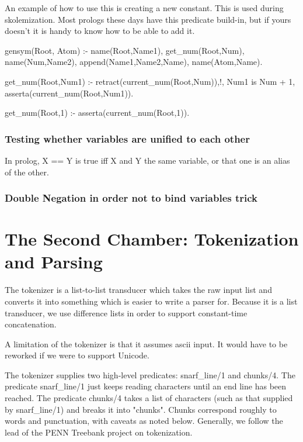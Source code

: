 \documentclass{book}[9pt]
\newenvironment{code}%
{\small \verbatim}%
{\endverbatim \large}
\begin{document}
An example of how to use this is creating a new constant.  This is
used during skolemization.  Most prologs these days have this
predicate build-in, but if yours doesn't it is handy to know how to be
able to add it.

\begin{code}
gensym(Root, Atom) :-
        name(Root,Name1),
        get_num(Root,Num),
        name(Num,Name2),
        append(Name1,Name2,Name),
        name(Atom,Name).

get_num(Root,Num1) :-
        retract(current_num(Root,Num)),!,
        Num1 is Num + 1,
        asserta(current_num(Root,Num1)).

get_num(Root,1) :- asserta(current_num(Root,1)).
\end{code}

\subsection{Testing whether variables are unified to each other}

In prolog, X == Y is true iff X and Y the same variable, or that one
is an alias of the other.
    
\subsection{Double Negation in order not to bind variables trick}

\chapter{The Second Chamber: Tokenization and Parsing}

The tokenizer is a list-to-list transducer which takes the raw input
list and converts it into something which is easier to write a parser
for.  Because it is a list transducer, we use difference lists in
order to support constant-time concatenation.

A limitation of the tokenizer is that it assumes ascii input.  It
would have to be reworked if we were to support Unicode.

The tokenizer supplies two high-level predicates: snarf\_line/1 and
chunks/4.  The predicate snarf\_line/1 just keeps reading characters
until an end line has been reached.  The predicate chunks/4 takes a
list of characters (such as that supplied by snarf\_line/1) and breaks
it into "chunks".  Chunks correspond roughly to words and punctuation,
with caveats as noted below.  Generally, we follow the lead of the
PENN Treebank project \cite{marcus93} on tokenization.
\end{document}
